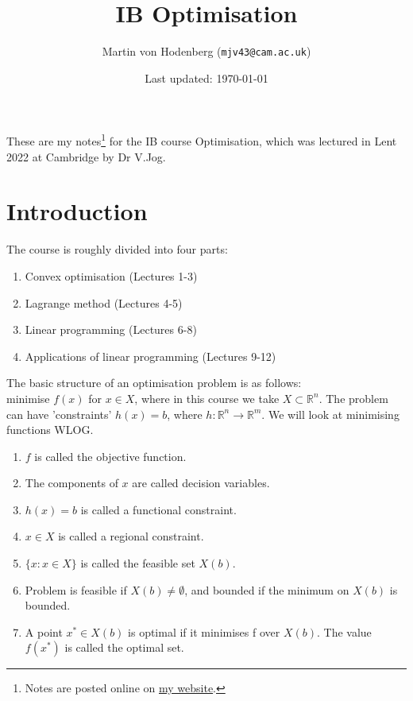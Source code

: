 \documentclass[egregdoesnotlikesansseriftitles,a4paper]{scrartcl}
\title{IB Optimisation}
\author{Martin von Hodenberg (\texttt{mjv43@cam.ac.uk})}
\date{Last updated: \today}
\begin{document}
\maketitle
These are my notes\footnote{Notes are posted online on \href{https://mjv43.user.srcf.net/}{my website}.} for the IB course Optimisation, which was lectured in Lent 2022 at Cambridge by Dr V.Jog.
\newpage
\tableofcontents
\newpage

\section{Introduction}

The course is roughly divided into four parts:
\begin{enumerate}
	\item Convex optimisation (Lectures 1-3)
	\item Lagrange method (Lectures 4-5)
	\item Linear programming (Lectures 6-8)
	\item Applications of linear programming (Lectures 9-12)
\end{enumerate}

\begin{definition*}
	The basic structure of an optimisation problem is as follows:\\
	minimise $f(x)$ for $x \in X$, where in this course we take $X \subset \mathbb{R}^n$. The problem can have 'constraints' $h(x)=b$, where $h:\mathbb{R}^n \to \mathbb{R}^m$. We will look at minimising functions WLOG.
	
	\begin{enumerate}
		\item $f$ is called the objective function.
		\item The components of $x$ are called decision variables.
		\item $h(x)=b$ is called a functional constraint.
		\item $x \in X$ is called a regional constraint.
		\item $\{x: x \in X\}$ is called the feasible set $X (b) $.
		\item Problem is feasible if $X(b)\neq \emptyset$, and bounded if the minimum on $X(b)$ is bounded.
		\item A point $x^* \in X(b)$ is optimal if it minimises f over $X(b)$. The value $f(x^*)$ is called the optimal set. 
	\end{enumerate}
	
\end{definition*}
\newpage
\end{document}
